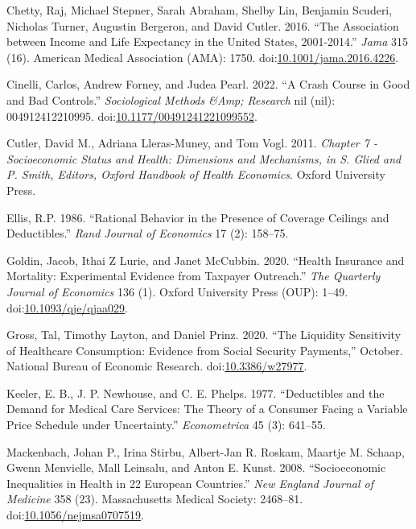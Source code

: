 \documentclass[a4paper,12pt]{article}
\begin{document}
\hypertarget{citeproc_bib_item_9}{Chetty, Raj, Michael Stepner, Sarah Abraham, Shelby Lin, Benjamin Scuderi, Nicholas Turner, Augustin Bergeron, and David Cutler. 2016. “The Association between Income and Life Expectancy in the United States, 2001-2014.” \textit{Jama} 315 (16). American Medical Association (AMA): 1750. doi:\href{https://doi.org/10.1001/jama.2016.4226}{10.1001/jama.2016.4226}.}

\hypertarget{citeproc_bib_item_10}{Cinelli, Carlos, Andrew Forney, and Judea Pearl. 2022. “A Crash Course in Good and Bad Controls.” \textit{Sociological Methods \&Amp; Research} nil (nil): 004912412210995. doi:\href{https://doi.org/10.1177/00491241221099552}{10.1177/00491241221099552}.}

\hypertarget{citeproc_bib_item_11}{Cutler, David M., Adriana Lleras-Muney, and Tom Vogl. 2011. \textit{Chapter 7 - Socioeconomic Status and Health: Dimensions and Mechanisms, in S. Glied and P. Smith, Editors, Oxford Handbook of Health Economics}. Oxford University Press.}

\hypertarget{citeproc_bib_item_12}{Ellis, R.P. 1986. “Rational Behavior in the Presence of Coverage Ceilings and Deductibles.” \textit{Rand Journal of Economics} 17 (2): 158–75.}

\hypertarget{citeproc_bib_item_13}{Goldin, Jacob, Ithai Z Lurie, and Janet McCubbin. 2020. “Health Insurance and Mortality: Experimental Evidence from Taxpayer Outreach.” \textit{The Quarterly Journal of Economics} 136 (1). Oxford University Press (OUP): 1–49. doi:\href{https://doi.org/10.1093/qje/qjaa029}{10.1093/qje/qjaa029}.}

\hypertarget{citeproc_bib_item_14}{Gross, Tal, Timothy Layton, and Daniel Prinz. 2020. “The Liquidity Sensitivity of Healthcare Consumption: Evidence from Social Security Payments,” October. National Bureau of Economic Research. doi:\href{https://doi.org/10.3386/w27977}{10.3386/w27977}.}

\hypertarget{citeproc_bib_item_15}{Keeler, E. B., J. P. Newhouse, and C. E. Phelps. 1977. “Deductibles and the Demand for Medical Care Services: The Theory of a Consumer Facing a Variable Price Schedule under Uncertainty.” \textit{Econometrica} 45 (3): 641–55.}

\hypertarget{citeproc_bib_item_16}{Mackenbach, Johan P., Irina Stirbu, Albert-Jan R. Roskam, Maartje M. Schaap, Gwenn Menvielle, Mall Leinsalu, and Anton E. Kunst. 2008. “Socioeconomic Inequalities in Health in 22 European Countries.” \textit{New England Journal of Medicine} 358 (23). Massachusetts Medical Society: 2468–81. doi:\href{https://doi.org/10.1056/nejmsa0707519}{10.1056/nejmsa0707519}.}
\end{document}
